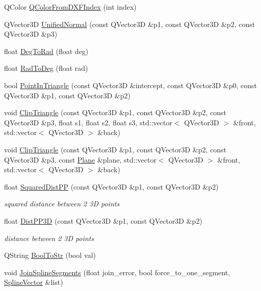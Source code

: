 \begin{DoxyCompactItemize}
Q\-Color \hyperlink{namespaceShipCAD_a9956eca83968462fc4c48c376a10d577}{Q\-Color\-From\-D\-X\-F\-Index} (int index)
\item 
Q\-Vector3\-D \hyperlink{namespaceShipCAD_a81e47e31f89000550b007c0f9a4d09aa}{Unified\-Normal} (const Q\-Vector3\-D \&p1, const Q\-Vector3\-D \&p2, const Q\-Vector3\-D \&p3)
\item 
float \hyperlink{namespaceShipCAD_ac344c080c66b4394cb988cf88c726029}{Deg\-To\-Rad} (float deg)
\item 
float \hyperlink{namespaceShipCAD_a3ad1916db38fb61e8a053f944df49cee}{Rad\-To\-Deg} (float rad)
\item 
bool \hyperlink{namespaceShipCAD_ae1773f0e415446342401a67430a8b643}{Point\-In\-Triangle} (const Q\-Vector3\-D \&intercept, const Q\-Vector3\-D \&p0, const Q\-Vector3\-D \&p1, const Q\-Vector3\-D \&p2)
\item 
void \hyperlink{namespaceShipCAD_a36b9b33181823761bc327d66c36c8d8f}{Clip\-Triangle} (const Q\-Vector3\-D \&p1, const Q\-Vector3\-D \&p2, const Q\-Vector3\-D \&p3, float s1, float s2, float s3, std\-::vector$<$ Q\-Vector3\-D $>$ \&front, std\-::vector$<$ Q\-Vector3\-D $>$ \&back)
\item 
void \hyperlink{namespaceShipCAD_a41e6294f71b66bca070c744accbb3ef2}{Clip\-Triangle} (const Q\-Vector3\-D \&p1, const Q\-Vector3\-D \&p2, const Q\-Vector3\-D \&p3, const \hyperlink{classShipCAD_1_1Plane}{Plane} \&plane, std\-::vector$<$ Q\-Vector3\-D $>$ \&front, std\-::vector$<$ Q\-Vector3\-D $>$ \&back)
\item 
float \hyperlink{namespaceShipCAD_a6f9f5ac15e7e2821bba27ba06827a4e1}{Squared\-Dist\-P\-P} (const Q\-Vector3\-D \&p1, const Q\-Vector3\-D \&p2)
\begin{DoxyCompactList}\small\item\em squared distance between 2 3\-D points \end{DoxyCompactList}\item 
float \hyperlink{namespaceShipCAD_a438e97b711c6878eba3bf7182e68a3c7}{Dist\-P\-P3\-D} (const Q\-Vector3\-D \&p1, const Q\-Vector3\-D \&p2)
\begin{DoxyCompactList}\small\item\em distance between 2 3\-D points \end{DoxyCompactList}\item 
Q\-String \hyperlink{namespaceShipCAD_a45ba7de6922e89cbddf2a4c9c810a2e4}{Bool\-To\-Str} (bool val)
\item 
void \hyperlink{namespaceShipCAD_a2eddf75f0e29363ab81a3fb0e0211848}{Join\-Spline\-Segments} (float join\-\_\-error, bool force\-\_\-to\-\_\-one\-\_\-segment, \hyperlink{namespaceShipCAD_a053b941b2c87049bb9380428d4d5a056}{Spline\-Vector} \&list)

\end{DoxyCompactItemize}
